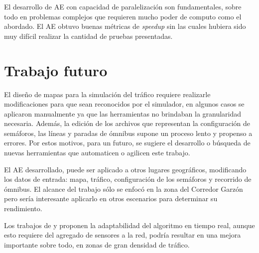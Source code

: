 El desarrollo de AE con capacidad de paralelización son fundamentales, sobre todo en problemas complejos que requieren mucho poder de computo como el abordado. El AE obtuvo buenas métricas de \emph{speedup} sin las cuales hubiera sido muy difícil realizar la cantidad de pruebas presentadas.

\section{Trabajo futuro}

El diseño de mapas para la simulación del tráfico requiere realizarle modificaciones para que sean reconocidos por el simulador, en algunos casos se aplicaron manualmente ya que las herramientas no brindaban la granularidad necesaria. Además, la edición de los archivos que representan la configuración de semáforos, las líneas y paradas de ómnibus supone un proceso lento y propenso a errores. Por estos motivos, para un futuro, se sugiere el desarrollo o búsqueda de nuevas herramientas que automaticen o agilicen este trabajo.

El AE desarrollado, puede ser aplicado a otros lugares geográficos, modificando  los datos de entrada: mapa, tráfico, configuración de los semáforos y recorrido de ómnibus. El alcance del trabajo sólo se enfocó en la zona del Corredor Garzón pero sería interesante aplicarlo en otros escenarios para determinar su rendimiento.

Los trabajos de  \citet{Montana1996} y \citet{Vogel2000} proponen la adaptabilidad del algoritmo en tiempo real, aunque esto requiere del agregado de sensores a la red, podría resultar en una mejora importante sobre todo, en zonas de gran densidad de tráfico.
